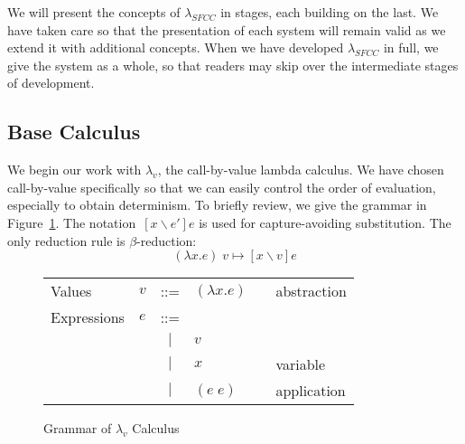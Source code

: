 \documentclass[11pt]{article}
\newcommand\x{\lambda x}
\begin{document}
We will present the concepts of $\lambda_{SFCC}$ in stages, each building on the last.
We have taken care so that the presentation of each system will remain valid as we extend it with additional concepts.
When we have developed $\lambda_{SFCC}$ in full, we give the system as a whole, so that readers may skip over the intermediate stages of development.

\newpage %
\subsection{Base Calculus}

We begin our work with $\lambda_v$, the call-by-value lambda calculus.
We have chosen call-by-value specifically so that we can easily control the order of evaluation, especially to obtain determinism.
To briefly review, we give the grammar in Figure~\ref{fig:lambdaCalculus}.
The notation~$[x \backslash e']e$ is used for capture-avoiding substitution.
The only reduction rule is $\beta$-reduction:
$$(\x.e)\;v \mapsto [x \backslash v]e$$

\begin{figure}[H]
\caption{Grammar of $\lambda_v$ Calculus}
\label{fig:lambdaCalculus}

\begin{tabular}{llclll}
Values & $v$ & ::= & $(\lambda x.e)$ && abstraction\\
Expressions & $e$ & ::= & \\
& & $|$ & $v$ && \\
& & $|$ & $x$ && variable \\
& & $|$ & $(e\;e)$ && application \\
\end{tabular}
\end{figure}
\end{document}
